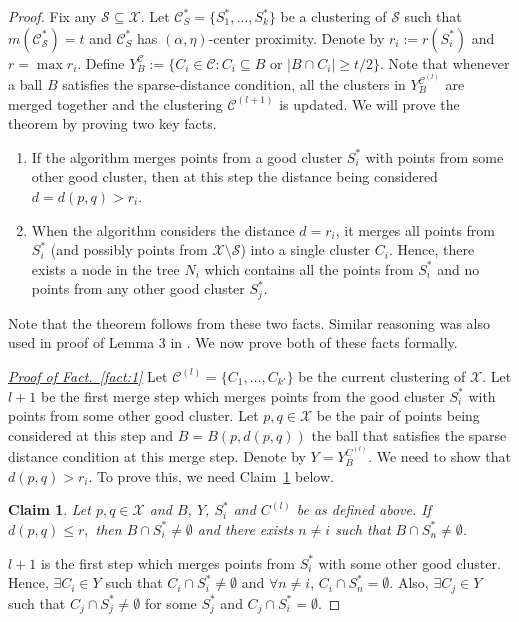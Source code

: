\documentclass[12pt]{article}
\newtheorem{smallLemma}{Claim}
\newcommand{\mc}{\mathcal}
\renewcommand\labelitemi{$\bullet$}
\begin{document}
\begin{proof}
Fix any $\mc S \subseteq \mc X$. Let $\mc C^*_S = \{S_1^*, \ldots, S_k^*\}$ be a clustering of $\mc S$ such that $m(\mc C_{\mc S}^*) = t$ and $\mc C^*_S$ has $(\alpha, \eta)$-center proximity. Denote by $r_i := r(S_i^*)$ and $r = \max r_i$. Define $Y_B^{\mc C} := \{C_i \in \mc C : C_i \subseteq B \text{ or } |B \cap C_i| \ge t/2\}$. Note that whenever a ball $B$ satisfies the sparse-distance condition, all the clusters in $Y_{B}^{{\mc C}^{(l)}}$ are merged together and the clustering $\mc C^{(l+1)}$ is updated. We will prove the theorem by proving two key facts.

\begin{enumerate}[nolistsep, noitemsep, label=\textbf{F.\arabic*},leftmargin=0.3in]
\renewcommand\labelitemi{$\diamond$}
\item \label{fact:1} If the algorithm merges points from a good cluster $S_i^*$ with points from some other good cluster,  then at this step the distance being considered $d = d(p,q) > r_i$.	
\item \label{fact:2} When the algorithm considers the distance $d = r_i$, it merges all points from $S_i^*$ (and possibly points from $\mc X\setminus \mc S$) into a single cluster $C_i$. Hence, there exists a node in the tree $N_i$ which contains all the points from $S_i^*$ and no points from any other good cluster $S_j^*$. 	
\end{enumerate}
Note that the theorem follows from these two facts. Similar reasoning was also used in proof of Lemma 3 in \cite{balcan2012clustering}. We now prove both of these facts formally. 

\noindent\textit{\underline{Proof of Fact.~\ref{fact:1}}}
Let $\mc C^{(l)} = \{C_1, \ldots, C_{k'}\}$ be the current clustering of $\mc X$. Let $l+1$ be the first merge step which merges points from the good cluster $S_i^*$ with points from some other good cluster. Let $p, q \in \mc X$ be the pair of points being considered at this step and $B = B(p, d(p, q))$ the ball that satisfies the sparse distance condition at this merge step. Denote by $Y = Y_{B}^{C^{(l)}}$. We need to show that $d(p, q) > r_i$. To prove this, we need Claim~\ref{claim:fromBothCluster} below. 

\begin{smallLemma}
\label{claim:fromBothCluster}
Let $p, q \in \mc X$ and $B$, $Y$, $S_i^*$ and $C^{(l)}$ be as defined above. If $d(p, q) \le r,$ then $B \cap S_i^* \neq \emptyset$ and there exists $n \neq i$ such that $B \cap S_n^* \neq \emptyset$.
\end{smallLemma}
\vspace{-0.1in} $l+1$ is the first step which merges points from $S_i^*$ with some other good cluster. Hence, $\exists C_i \in Y$ such that $C_i\cap S_i^*  \neq \emptyset$ and $\forall n \neq i$, $C_i \cap S_n^* = \emptyset$. Also, $\exists C_j \in Y$ such that $C_j \cap S_j^* \neq \emptyset$ for some $S_j^*$ and $C_j \cap S_i^* = \emptyset$.


\end{proof}
\end{document}
